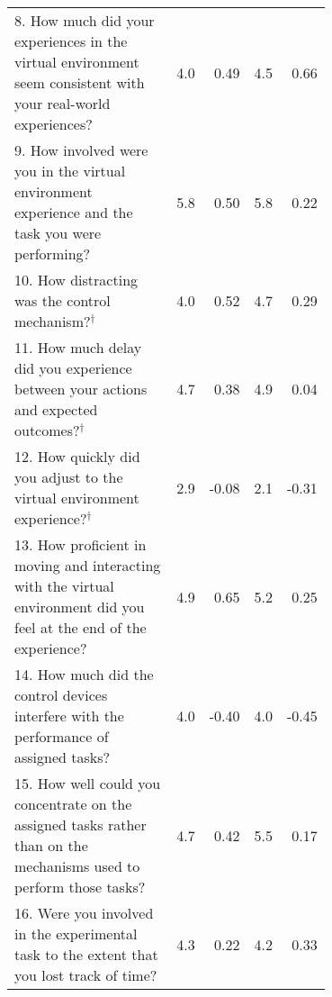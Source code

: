 \begin{tabular}{m{0.7\linewidth}rrrr}
8. How much did your experiences in the virtual environment seem consistent with your real-world experiences?                                                                         & 4.0 &  0.49  & 4.5 &  0.66  \\
9. How involved were you in the virtual environment experience and the task you were performing?                                                                                      & 5.8 &  0.50  & 5.8 &  0.22  \\
10. How distracting was the control mechanism?$^\dagger$                                                                                                                              & 4.0 &  0.52  & 4.7 &  0.29  \\
11. How much delay did you experience between your actions and expected outcomes?$^\dagger$                                                                                           & 4.7 &  0.38  & 4.9 &  0.04  \\
12. How quickly did you adjust to the virtual environment experience?$^\dagger$                                                                                                       & 2.9 &  -0.08  & 2.1 &  -0.31  \\
13. How proficient in moving and interacting with the virtual environment did you feel at the end of the experience?                                                                  & 4.9 &  0.65  & 5.2 &  0.25  \\
14. How much did the control devices interfere with the performance of assigned tasks?                                                                                                & 4.0 &  -0.40  & 4.0 &  -0.45  \\
15. How well could you concentrate on the assigned tasks rather than on the mechanisms used to perform those tasks?                                                                   & 4.7 &  0.42  & 5.5 &  0.17  \\
16. Were you involved in the experimental task to the extent that you lost track of time?                                                                                             & 4.3 &  0.22  & 4.2 &  0.33  \\
\bottomrule
\end{tabular}
